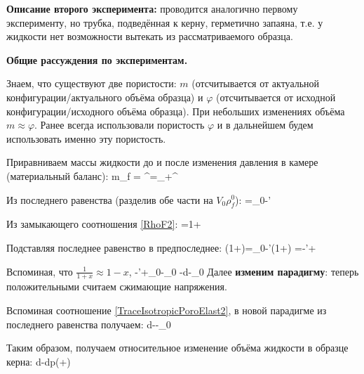 \documentclass[main.tex]{subfiles}
\begin{document}
\textbf{Описание второго эксперимента:} проводится аналогично первому эксперименту, но трубка, подведённая к керну, герметично запаяна, т.е. у жидкости нет возможности вытекать из рассматриваемого образца. 


\textbf{Общие рассуждения по экспериментам.}

Знаем, что существуют две пористости: $m$ (отсчитывается от актуальной конфигурации/актуального объёма образца) и $\varphi$ (отсчитывается от исходной конфигурации/исходного объёма образца). При небольших изменениях объёма $m\approx\varphi$. Ранее всегда использовали пористость $\varphi$ и в дальнейшем будем использовать именно эту пористость.

Приравниваем массы жидкости до и после изменения давления в камере (материальный баланс):
\beq
m_f = \Rightarrow {}^{}=_{}+^{}
\eeq

Из последнего равенства (разделив обе части на $V_0\rho_f^0$):
\beq
{}\cdot{}=\varphi_0-\varphi'\cdot{}
\eeq

Из замыкающего соотношения \eqref{RhoF2}:
\beq
{}=1+
\eeq

Подставляя последнее равенство в предпоследнее:
\beq
{}\left(1+\right)=\varphi_0-\varphi'\left(1+\right)
\eeq
\beq
{}=-\varphi'+
\eeq

Вспоминая, что $\displaystyle{}\frac{1}{1+x}\approx 1-x$,
\beq
{}\approx-\varphi'+\varphi_0-\varphi_0
\eeq
\beq
{}\approx-d\varphi-\varphi_0
\eeq
Далее \textbf{изменим парадигму}: теперь положительными считаем сжимающие напряжения.

Вспоминая соотношение \eqref{TraceIsotropicPoroElast2}, в новой парадигме из последнего равенства получаем:
\beq
{}\approx\alpha d\varepsilon--\varphi_0
\eeq

Таким образом, получаем относительное изменение объёма жидкости в образце керна:
\beq\label{KernExperiment1and2}
\approx\alpha d\varepsilon-dp\left(+\right)
\eeq
\end{document}
